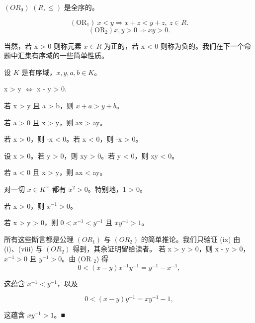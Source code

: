 $ (OR_{0}) $  $ (R,\leq) $ 是全序的。

\[
(\mathrm{O R}_{1})~x<y\Rightarrow x+z<y+z,~z\in R.
\]
\[
(\mathrm{OR}_{2})x,y>0\Rightarrow x y>0.
\]

当然，若 x > 0 则称元素  $ x \in R $ 为正的，若 x < 0 则称为负的。我们在下一个命题中汇集有序域的一些简单性质。

\begin{proposition}

设 $ K $ 是有序域，$ x, y, a, b \in K $。

\begin{subitems}
\item

x > y  $ \Leftrightarrow $ x - y > 0.

\item

若 x > y 且 a > b，则  $ x + a > y + b $。

\item

若 a > 0 且 x > y，则 ax > ay。

\item

若 x > 0，则 -x < 0。若 x < 0，则 -x > 0。

\item

设 x > 0。若 y > 0，则 xy > 0。若 y < 0，则 xy < 0。

\item

若 a < 0 且 x > y，则 ax < ay。

\item

对一切  $ x \in K^\times $ 都有  $ x^2 > 0 $。特别地，1 > 0。

\item

若 x > 0，则  $ x^{-1} > 0 $。

\item

若 x > y > 0，则  $ 0 < x^{-1} < y^{-1} $ 且  $ xy^{-1} > 1 $。

\proofhead
所有这些断言都是公理  $ (OR_{1}) $ 与  $ (OR_{2}) $ 的简单推论。我们只验证 (ix) 由 (i)、(viii) 与  $ (OR_{2}) $ 得到，其余证明留给读者。
若 x > y > 0，则 x - y > 0， $ x^{-1} > 0 $ 且  $ y^{-1} > 0 $。由 (OR $ _{2} $) 得
\[
0<(x-y)x^{-1}y^{-1}=y^{-1}-x^{-1},
\]

这蕴含  $ x^{-1} < y^{-1} $，以及

\[
0<(x-y)y^{-1}=x y^{-1}-1,
\]

这蕴含  $ xy^{-1} > 1 $。■

\end{subitems}

\end{proposition}

